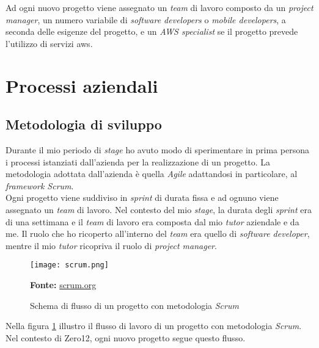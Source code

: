 \noindent
Ad ogni nuovo progetto viene assegnato un \textit{team} di lavoro composto da un \textit{project manager}, un numero variabile di \textit{software developers} o \textit{mobile developers}, a seconda delle esigenze del progetto, e un \textit{AWS specialist} se il progetto prevede l'utilizzo di servizi \gls{aws}. 
\section{Processi aziendali}
\subsection{Metodologia di sviluppo}
Durante il mio periodo di \textit{stage} ho avuto modo di sperimentare in prima persona i processi istanziati dall'azienda per la realizzazione di un progetto.
La metodologia adottata dall'azienda è quella \textit{Agile} adattandosi in particolare, al \textit{framework Scrum}.\\ 
Ogni progetto viene suddiviso in \textit{sprint} di durata fissa e ad ognuno viene assegnato un \textit{team} di lavoro.
Nel contesto del mio \textit{stage}, la durata degli \textit{sprint} era di una settimana e il \textit{team} di lavoro era composta dal mio \textit{tutor} aziendale e da me.
Il ruolo che ho ricoperto all'interno del \textit{team} era quello di \textit{software developer}, mentre il mio \textit{tutor} ricopriva il ruolo di \textit{project manager}.
\begin{figure}[H]
    \centering
    \texttt{[image: scrum.png]}
    \caption{Schema di flusso di un progetto con metodologia \textit{Scrum}}
    \small \textbf{Fonte:} \url{scrum.org}
    \label{fig:scrum}
\end{figure}
\noindent
Nella figura \ref{fig:scrum} illustro il flusso di lavoro di un progetto con metodologia \textit{Scrum}. Nel contesto di Zero12, ogni nuovo progetto segue questo flusso. 
